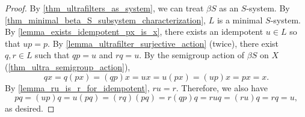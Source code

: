 \begin{proof}
\leanok{}
    By \cref{thm_ultrafilters_as_system}, we can treat $\beta S$ as an $S$-system. By \cref{thm_minimal_beta_S_subsystem_characterization}, $L$ is a minimal $S$-system. By \cref{lemma_exists_idempotent_px_is_x}, there exists an idempotent $u \in L$ so that $up = p$.  By \cref{lemma_ultrafilter_surjective_action} (twice), there exist $q, r \in L$ such that $qp = u$ and $rq = u$. By the semigroup action of $\beta S$ on $X$ (\cref{thm_ultra_semigroup_action}),
    \[qx = q (p x) = (qp) x = ux = u (px) = (up) x = px = x.\]
    By \cref{lemma_ru_is_r_for_idempotent}, $ru = r$.  Therefore, we also have
    \[pq = (up)q = u (pq) = (rq) (pq) = r (qp) q = ruq = (ru) q = rq = u,\]
    as desired.
\end{proof}





        
